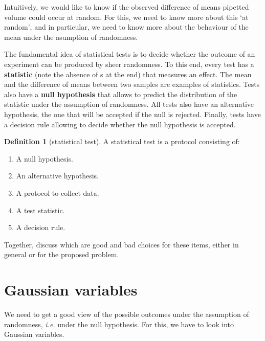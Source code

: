 \documentclass[a4paper]{article}
\theoremstyle{definition}
\newtheorem{definition}{Definition}
\begin{document}
Intuitively, we would like to know if the observed difference of means
pipetted volume could occur at random. For this, we need to know more
about this `at random', and in particular, we need to know more about
the behaviour of the mean under the asumption of randomness.

The fundamental idea of statistical tests is to decide whether the
outcome of an experiment can be produced by sheer randomness. To
this end, every test has a \textbf{statistic} (note the absence of s
at the end) that measures an effect. The mean and the difference of
means between two samples are examples of statistics. Tests also have
a \textbf{null hypothesis} that allows to predict the distribution
of the statistic under the assumption of randomness. All tests also
have an alternative hypothesis, the one that will be accepted if the
null is rejected. Finally, tests
have a decision rule allowing to decide whether the null hypothesis
is accepted.


\begin{definition}[statistical test]
\label{test}
A statistical test is a protocol consisting of:
  \begin{enumerate}
  \item
  A null hypothesis.
  \item
  An alternative  hypothesis.
  \item
  A protocol to collect data.
  \item
  A test statistic.
  \item
  A decision rule.
  \end{enumerate}
\end{definition}

\begin{Exercise}
Together, discuss which are good and bad choices for these items,
either in general or for the proposed problem.
\end{Exercise}


\section{Gaussian variables}

We need to get a good view of the possible outcomes under the assumption
of randomness, \textit{i.e.} under the null hypothesis. For this, we
have to look into Gaussian variables.
\end{document}

